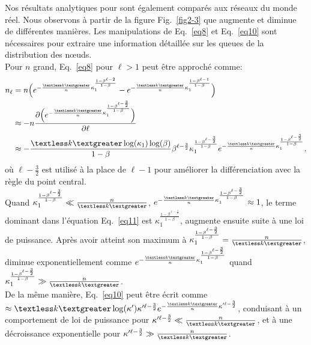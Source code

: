 Nos résultats analytiques pour \nl sont également comparés aux réseaux du monde réel. Nous observons à partir de la figure Fig.~\ref{fig2-3} que \nl augmente et diminue de différentes manières. Les manipulations de Eq.~\eqref{eq8} et Eq.~\eqref {eq10} sont nécessaires pour extraire une information détaillée sur les queues de la distribution des nœuds. \\ Pour $n$ grand, Eq.~\eqref{eq8} pour $\ell>1$ peut être approché comme:
\begin{align}
n_{\ell}&=n\Big(e^{-\frac{\km}{n}\kappa_1^{\frac{1-\beta^{\ell-2}}{1-\beta}}}-e^{-\frac{\km}{n}\kappa_1^{\frac{1-\beta^{\ell-1}}{1-\beta}}}\Big) \nonumber \\
&\approx -n \frac{\partial \Big(e^{-\frac{\km}{n}\kappa_1^{\frac{1-\beta^{\ell-\frac{3}{2}}}{1-\beta}}} \Big) }{\partial \ell} \nonumber \\
&\approx -\frac {\km \log(\kappa_1) \log(\beta)} {1-\beta} \beta^{\ell-\frac{3}{2}} \kappa_1^{\frac{1-\beta^{\ell-\frac{3}{2}}}{1-\beta}}e^{-\frac{\km}{n}\kappa_1^{\frac{1-\beta^{\ell-\frac{3}{2}}}{1-\beta}}}, 
\label{eq11}
\end{align}
où $ \ell-\frac{3}{2} $ est utilisé à la place de $ \ell-1$ pour améliorer la différenciation avec la règle du point central. \\
Quand $\kappa_1^{\frac{1-\beta^{\ell-\frac{3}{2}}}{1-\beta}}\ll\frac{n}{\km}$,  $e^{-\frac{\km}{n}\kappa_1^{\frac{1-\beta^{\ell-\frac{3}{2}}}{1-\beta}}}\approx 1$, le terme dominant dans l'équation Eq.~\eqref{eq11} est $\kappa_1^{\frac{1-\beta^{\ell-\frac{3}{2}}}{1-\beta}}$, \nl augmente ensuite suite à une loi de puissance. Après avoir atteint son maximum à $\kappa_1^{\frac{1-\beta^{\ell-\frac{3}{2}}}{1-\beta}}=\frac{n}{\km}$, \nl diminue exponentiellement comme
$e^{-\frac{\km}{n}\kappa_1^{\frac{1-\beta^{\ell-\frac{3}{2}}}{1-\beta}}}$ quand $\kappa_1^{\frac{1-\beta^{\ell-\frac{3}{2}}}{1-\beta}}\gg\frac{n}{\km}$.\\
De la même manière, Eq.~\eqref{eq10} peut être écrit comme \nl$\approx \km \log(\kappa')\kappa'^{\ell-\frac{3}{2}}e^{-\frac{\km}{n}\kappa'^{\ell-\frac{3}{2}}}$, conduisant à un comportement de loi de puissance pour $\kappa'^{\ell-\frac{3}{2}} \ll \frac{n}{\km}$, et à une décroissance exponentielle pour $\kappa'^{\ell-\frac{3}{2}} \gg \frac{n}{\km}$.

